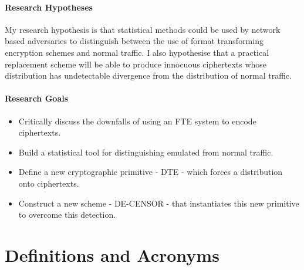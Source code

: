 \documentclass[ %
                    author={Samuel Russell},
                supervisor={Prof. Bogdan Warinschi},
                    degree={MEng},
                     title={Innocuous Ciphertexts},
                  subtitle={The DE-CENSOR Scheme},
                      type={research},
                      year={2018} ]{dissertation}
\begin{document}
\subsubsection{Research Hypotheses}

My research hypothesis is that statistical methods could be used by network based adversaries to distinguish between the use of format transforming encryption schemes and normal traffic. I also hypothesise that a practical replacement scheme will be able to produce innocuous ciphertexts whose distribution has undetectable divergence from the distribution of normal traffic.

\subsubsection{Research Goals}

\begin{itemize}
\item Critically discuss the downfalls of using an FTE system to encode ciphertexts.
\item Build a statistical tool for distinguishing emulated from normal traffic.
\item Define a new cryptographic primitive - DTE - which forces a distribution onto ciphertexts.
\item Construct a new scheme - DE-CENSOR - that instantiates this new primitive to overcome this detection.
\end{itemize}


\chapter*{Definitions and Acronyms}

\vspace{1cm} 
\end{document}
